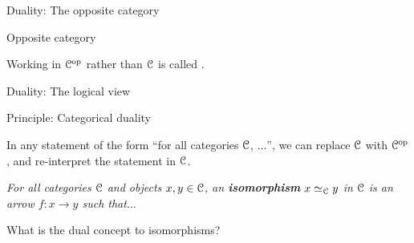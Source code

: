 \begin{frame}[t]{Duality: The opposite category} %

  \par{} Opposite category
  \vspace{5 \baselineskip}

  \par{}

  \vspace{7 \baselineskip}
  \par Working in $\mathcal{C}^{\mathrm{op}}$ rather than $\mathcal{C}$ is called .
  
\end{frame}

\begin{frame}[t]{Duality: The logical view} %

  \begin{block}{Principle: Categorical duality}
    \par In any statement of the form ``for all categories $\mathcal{C}$, $\dots$'', we can replace $\mathcal{C}$ with $\mathcal{C}^{\mathrm{op}}$, and re-interpret the statement in $\mathcal{C}$.
  \end{block}

  \par{} \textit{For all categories $\mathcal{C}$ and objects $x, y \in \mathcal{C}$, an \textbf{isomorphism} $x \simeq_{\mathcal{C}} y$ in $\mathcal{C}$ is an arrow $f : x \to y$ such that$\dots$}
  \vspace{4\baselineskip}
  \par{} What is the dual concept to isomorphisms?
  
\end{frame}


  


  
